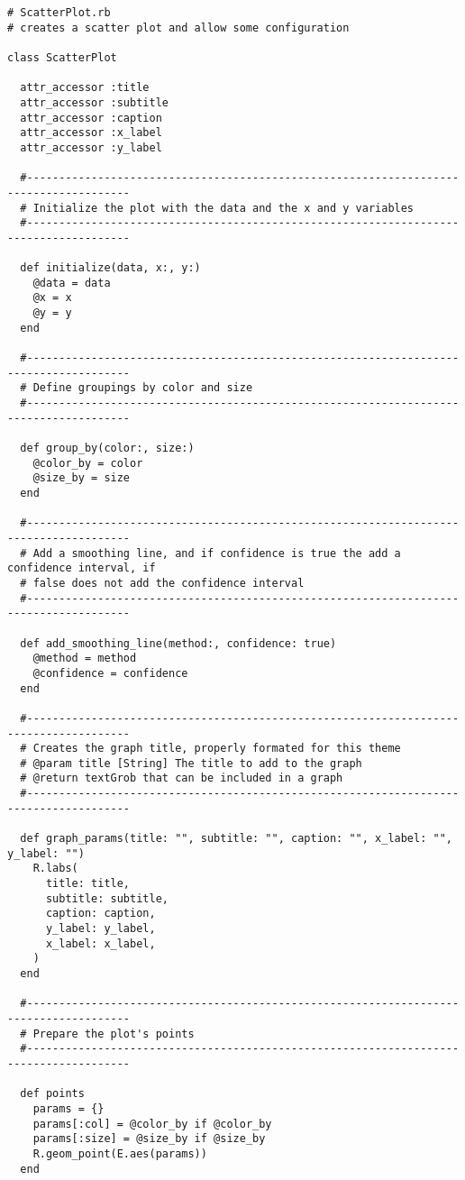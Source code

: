 \documentclass[]{article}
\begin{document}
\begin{verbatim}
# ScatterPlot.rb
# creates a scatter plot and allow some configuration
    
class ScatterPlot

  attr_accessor :title
  attr_accessor :subtitle
  attr_accessor :caption
  attr_accessor :x_label
  attr_accessor :y_label
  
  #--------------------------------------------------------------------------------------
  # Initialize the plot with the data and the x and y variables
  #--------------------------------------------------------------------------------------

  def initialize(data, x:, y:)
    @data = data
    @x = x
    @y = y
  end

  #--------------------------------------------------------------------------------------
  # Define groupings by color and size
  #--------------------------------------------------------------------------------------

  def group_by(color:, size:)
    @color_by = color
    @size_by = size
  end

  #--------------------------------------------------------------------------------------
  # Add a smoothing line, and if confidence is true the add a confidence interval, if
  # false does not add the confidence interval
  #--------------------------------------------------------------------------------------

  def add_smoothing_line(method:, confidence: true)
    @method = method
    @confidence = confidence
  end
  
  #--------------------------------------------------------------------------------------
  # Creates the graph title, properly formated for this theme
  # @param title [String] The title to add to the graph
  # @return textGrob that can be included in a graph
  #--------------------------------------------------------------------------------------

  def graph_params(title: "", subtitle: "", caption: "", x_label: "", y_label: "")
    R.labs(
      title: title, 
      subtitle: subtitle, 
      caption: caption,
      y_label: y_label, 
      x_label: x_label, 
    )
  end

  #--------------------------------------------------------------------------------------
  # Prepare the plot's points
  #--------------------------------------------------------------------------------------

  def points
    params = {}
    params[:col] = @color_by if @color_by
    params[:size] = @size_by if @size_by
    R.geom_point(E.aes(params))
  end
      

\end{verbatim}
\end{document}
